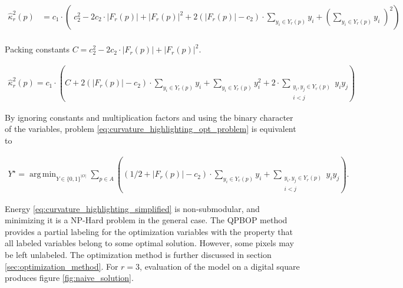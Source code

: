 \documentclass[runningheads]{llncs}
\DeclareMathOperator*{\argmin}{arg\,min}
\begin{document}
	\begin{align*}
		\hat{\kappa}_{r}^2(p) &= c_1 \cdot \left( \; c_2^2 - 2c_2 \cdot |F_r(p)| + |F_r(p)|^2 + 2\left( |F_r(p)| - c_2 \right) \cdot \sum_{y_i \in Y_r(p)}{y_i}  + \left( \sum_{y_i \in Y_r(p)}{y_i} \; \right) ^2 \right) \\[1em]
	\end{align*}
	
	Packing constants $C=c_2^2 - 2c_2 \cdot |F_r(p)| + |F_r(p)|^2$.
	
	\begin{align*}
		\hat{\kappa}_{r}^2(p) = c_1 \cdot \left( C + 2\left( |F_r(p)| - c_2 \right) \cdot \sum_{y_i \in Y_r(p)}{y_i} + \sum_{y_i \in Y_r(p)}{y_i^2} + 2 \cdot \sum_{ \substack{y_i,y_j \in Y_r(p) \\ i<j} }{y_iy_j}  \right)
	\end{align*}
	
	By ignoring constants and multiplication factors and using the binary character of the variables, problem \eqref{eq:curvature_highlighting_opt_problem} is equivalent to

	
\begin{align}			
	Y^{\star} = \argmin_{Y \in \{0,1\}^{|O|}} \sum_{p \in A}{ \left( { (1/2+ |F_r(p)|-c_2) \cdot \sum_{y_i \in Y_r(p)}{y_i} } + \sum_{ \substack{y_i,y_j \in Y_r(p) \\ i<j} }{y_iy_j} \right) }.
	\label{eq:curvature_highlighting_simplified}
\end{align}

Energy \eqref{eq:curvature_highlighting_simplified} is non-submodular, and minimizing it is a NP-Hard problem in the general case. The QPBOP \cite{rother07} method provides a partial labeling for the optimization variables with the property that all labeled variables belong to some optimal solution. However, some pixels may be left unlabeled. The optimization method is further discussed in section \ref{sec:optimization_method}. For $r=3$, evaluation of the model on a digital square produces figure \ref{fig:naive_solution}.
\end{document}

